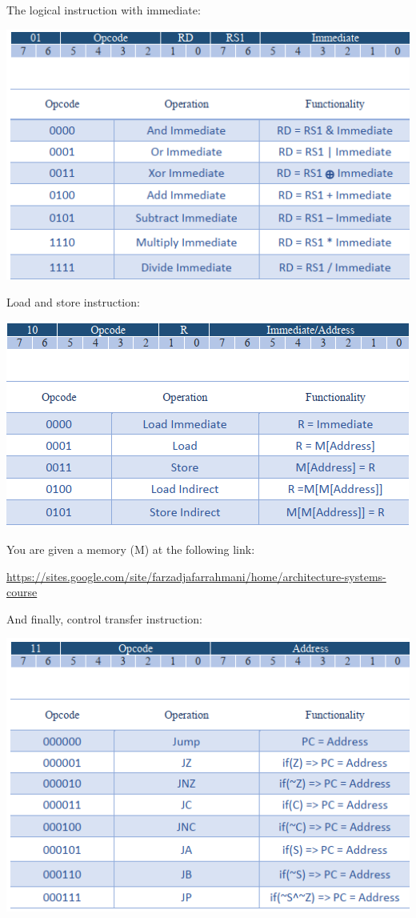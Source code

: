 \documentclass[11pt]{article}
\begin{document}
The logical instruction with immediate:

\begin{center}
\includegraphics[]{imm.png}    
\end{center}

\newpage

Load and store instruction:

\begin{center}
\includegraphics[]{LS.png}
\end{center}


You are given a memory (M) at the following link:

\url{https://sites.google.com/site/farzadjafarrahmani/home/architecture-systems-course}


\bigskip


And finally, control transfer instruction:

\begin{center}
\includegraphics[]{CT.png}    
\end{center}
\end{document}
